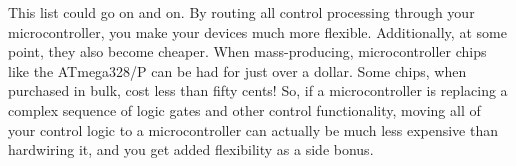 This list could go on and on.
By routing all control processing through your microcontroller, you make your devices much more flexible.
Additionally, at some point, they also become cheaper.
When mass-producing, microcontroller chips like the ATmega328/P can be had for just over a dollar.
Some chips, when purchased in bulk, cost less than fifty cents!
So, if a microcontroller is replacing a complex sequence of logic gates and other control functionality, moving all of your control logic to a microcontroller can actually be much less expensive than hardwiring it, and you get added flexibility as a side bonus.

\applysection


